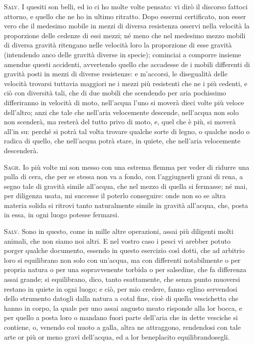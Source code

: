 \documentclass[11pt,twoside,openany]{book}
\newcommand{\speaker}[1]{\textcolor{rubric}{\textsc{#1}}\space}
\begin{document}
\speaker{Salv.} I quesiti son belli, ed io ci ho molte volte pensato: vi dirò il discorso fattoci attorno, e quello che ne ho in ultimo ritratto. Dopo essermi certificato, non esser vero che il medesimo mobile in mezzi di diversa resistenza osservi nella velocità la proporzione delle cedenze di essi mezzi; né meno che nel medesimo mezzo mobili di diversa gravità ritengano nelle velocità loro la proporzione di esse gravità (intendendo anco delle gravità diverse in specie); cominciai a comporre insieme amendue questi accidenti, avvertendo quello che accadesse de i mobili differenti di gravità posti in mezzi di diverse resistenze: e m'accorsi, le disegualità delle velocità trovarsi tuttavia maggiori ne i mezzi più resistenti che ne i più cedenti, e ciò con diversità tali, che di due mobili che scendendo per aria pochissimo differiranno in velocità di moto, nell'acqua l'uno si moverà dieci volte più veloce dell'altro; anzi che tale che nell'aria velocemente descende, nell'acqua non solo non scenderà, ma resterà del tutto privo di moto, e, quel che è più, si moverà all'in su: perché si potrà tal volta trovare qualche sorte di legno, o qualche nodo o radica di quello, che nell'acqua potrà stare, in quiete, che nell'aria velocemente descenderà.

\speaker{Sagr.} Io più volte mi son messo con una estrema flemma per veder di ridurre una palla di cera, che per se stessa non va a fondo, con l'aggiugnerli grani di rena, a segno tale di gravità simile all'acqua, che nel mezzo di quella si fermasse; né mai, per diligenza usata, mi successe il poterlo conseguire: onde non so se altra materia solida si ritrovi tanto naturalmente simile in gravità all'acqua, che, posta in essa, in ogni luogo potesse fermarsi.

\speaker{Salv.} Sono in questo, come in mille altre operazioni, assai più diligenti molti animali, che non siamo noi altri. E nel vostro caso i pesci vi arebber potuto porger qualche documento, essendo in questo esercizio così dotti, che ad arbitrio loro si equilibrano non solo con un'acqua, ma con differenti notabilmente o per propria natura o per una sopravvenente torbida o per salsedine, che fa differenza assai grande; si equilibrano, dico, tanto esattamente, che senza punto muoversi restano in quiete in ogni luogo; e ciò, per mio credere, fanno eglino servendosi dello strumento datogli dalla natura a cotal fine, cioè di quella vescichetta che hanno in corpo, la quale per uno assai angusto meato risponde alla lor bocca, e per quello a posta loro o mandano fuori parte dell'aria che in dette vesciche si contiene, o, venendo col nuoto a galla, altra ne attraggono, rendendosi con tale arte or più or meno gravi dell'acqua, ed a lor beneplacito equilibrandosegli.
\end{document}
